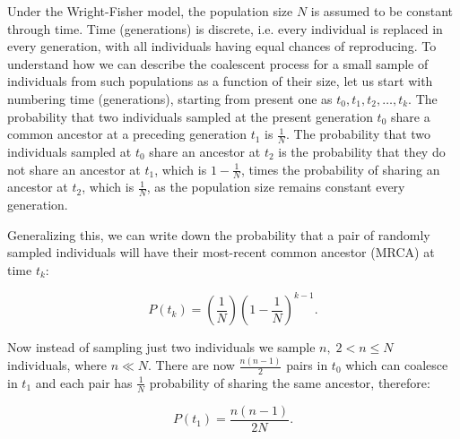 Under the Wright-Fisher model, the population size $N$ is assumed to be constant through time.
Time (generations) is discrete, i.e. every individual is replaced in every generation, with all individuals having equal chances of reproducing.
To understand how we can describe the coalescent process for a small sample of individuals from such populations as a function of their size, let us start with numbering time (generations), starting from present one as $t_{0},t_{1},t_{2},\ldots,t_{k}$.
The probability that two individuals sampled at the present generation $t_{0}$ share a common ancestor at a preceding generation $t_{1}$ is $\frac{1}{N}$.
The probability that two individuals sampled at $t_{0}$ share an ancestor at $t_{2}$ is the probability that they do not share an ancestor at $t_{1}$, which is $1-\frac{1}{N}$, times the probability of sharing an ancestor at $t_{2}$, which is $\frac{1}{N}$, as the population size remains constant every generation.


Generalizing this, we can write down the probability that a pair of randomly sampled individuals will have their most-recent common ancestor (MRCA) at time $t_{k}$:

\begin{equation}
P\left(t_{k}\right)=\left(\frac{1}{N}\right)\left(1-\frac{1}{N}\right)^{k-1}.
\label{eq:wright-fisher-two-individuals}
\end{equation}

\noindent
Now instead of sampling just two individuals we sample $n,\;2<n\leq N$ individuals, where $n\ll N$.
There are now $\frac{n\left(n-1\right)}{2}$ pairs in $t_{0}$ which can coalesce in $t_{1}$ and each pair has  $\frac{1}{N}$ probability of sharing the same ancestor, therefore:

\begin{equation}
P\left(t_{1}\right)=\frac{n\left(n-1\right)}{2N}.
\label{eq:wright-fisher-n-individuals}
\end{equation}

